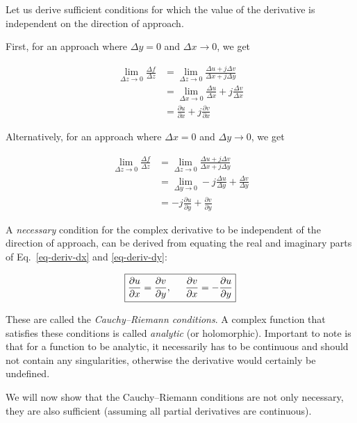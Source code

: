 Let us derive sufficient conditions for which the value of the derivative is
independent on the direction of approach.

First, for an approach where $\Delta y = 0$ and $\Delta x \to 0$, we get

\begin{align}
\lim_{\Delta z \to 0} \frac{\Delta f}{\Delta z}
& = \lim_{\Delta z \to 0} \frac{\Delta u + j \Delta v}{\Delta x + j \Delta y}
\nonumber \\
& = \lim_{\Delta x \to 0} \frac{\Delta u}{\Delta x} + j \frac{\Delta v}{\Delta
x} \nonumber \\
& = \frac{\partial u}{\partial x} + j \frac{\partial v}{\partial
x}\label{eq-deriv-dx}
\end{align} 

Alternatively, for an approach where $\Delta x = 0$ and $\Delta y \to 0$, we get

\begin{align}
\lim_{\Delta z \to 0} \frac{\Delta f}{\Delta z}
& = \lim_{\Delta z \to 0} \frac{\Delta u + j \Delta v}{\Delta x + j \Delta y}
\nonumber \\
& = \lim_{\Delta y \to 0} -j\frac{\Delta u}{\Delta y} +  \frac{\Delta v}{\Delta
y} \nonumber \\
& = -j\frac{\partial u}{\partial y} +  \frac{\partial v}{\partial
y}\label{eq-deriv-dy}
\end{align}

A \emph{necessary} condition for the complex derivative to be independent of the
direction of approach, can be derived from equating the real and imaginary parts
of Eq.~\ref{eq-deriv-dx} and \ref{eq-deriv-dy}:

\begin{equation}
\fbox{$\displaystyle
\frac{\partial u}{\partial x} = \frac{\partial v}{\partial y}, \hspace{.5cm}
\frac{\partial v}{\partial x} = -\frac{\partial u}{\partial y}
\label{eq-Cauchy-Riemann}
$}
\end{equation} 

These are called the \emph{Cauchy--Riemann conditions}. A complex function that
satisfies these conditions is called \emph{analytic} (or holomorphic). Important
to note is that for a function to be analytic, it necessarily has to be
continuous and should not contain any singularities, otherwise the derivative
would certainly be undefined.

We will now show that the Cauchy--Riemann conditions are not only necessary,
they are also sufficient (assuming all partial derivatives are continuous). 

